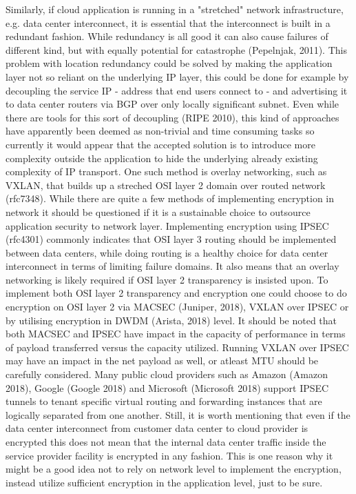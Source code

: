 \documentclass{article}
\begin{document}
\par
Similarly, if cloud application is running in a "stretched" network infrastructure, e.g. data center interconnect, it is essential that the interconnect is built in a redundant fashion. While redundancy is all good it can also cause failures of different kind, but with equally potential for catastrophe (Pepelnjak, 2011).
This problem with location redundancy could be solved by making the application layer not so reliant on the underlying IP layer, this could be done for example by decoupling the service IP - address that end users connect to - and advertising it to data center routers via BGP over only locally significant subnet. Even while there are tools for this sort of decoupling (RIPE 2010), this kind of approaches have apparently been deemed as non-trivial and time consuming tasks so currently it would appear that the accepted solution is to introduce more complexity outside the application to hide the underlying already existing complexity of IP transport. One such method is overlay networking, such as VXLAN, that builds up a streched OSI layer 2 domain over routed network (rfc7348).
While there are quite a few methods of implementing encryption in network it should be questioned if it is a sustainable choice to outsource application security to network layer. Implementing encryption using IPSEC (rfc4301) commonly indicates that OSI layer 3 routing should be implemented between data centers, while doing routing is a healthy choice for data center interconnect in terms of limiting failure domains. It also means that an overlay networking is likely required if OSI layer 2 transparency is insisted upon. To implement both OSI layer 2 transparency and encryption one could choose to do encryption on OSI layer 2 via MACSEC (Juniper, 2018), VXLAN over IPSEC or by utilising encryption in DWDM (Arista, 2018) level. It should be noted that both MACSEC and IPSEC have impact in the capacity of performance in terms of payload transferred versus the capacity utilized. Running VXLAN over IPSEC may have an impact in the net payload as well, or atleast MTU should be carefully considered. Many public cloud providers such as Amazon (Amazon 2018), Google (Google 2018) and Microsoft (Microsoft 2018) support IPSEC tunnels to tenant specific virtual routing and forwarding instances that are logically separated from one another. Still, it is worth mentioning that even if the data center interconnect from customer data center to cloud provider is encrypted this does not mean that the internal data center traffic inside the service provider facility is encrypted in any fashion. This is one reason why it might be a good idea not to rely on network level to implement the encryption, instead utilize sufficient encryption in the application level, just to be sure.
\end{document}
